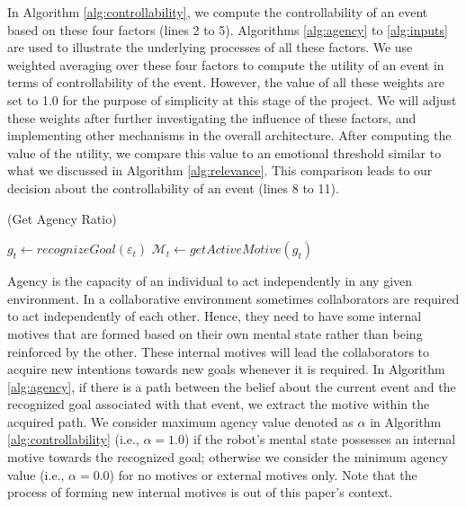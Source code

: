\documentclass{aamas2016}
\begin{document}
In Algorithm \ref{alg:controllability}, we compute the controllability of an
event based on these four factors (lines 2 to 5). Algorithms \ref{alg:agency} to
\ref{alg:inputs} are used to illustrate the underlying processes of all these
factors. We use weighted averaging over these four factors to compute the
utility of an event in terms of controllability of the event. However, the
value of all these weights are set to 1.0 for the purpose of simplicity at
this stage of the project. We will adjust these weights after further
investigating the influence of these factors, and implementing other mechanisms
in the overall architecture. After computing the value of the utility, we
compare this value to an emotional threshold similar to what we discussed in
Algorithm \ref{alg:relevance}. This comparison leads to our decision about the
controllability of an event (lines 8 to 11).

\renewcommand\thealgorithm{4\alph{algorithm}}
\setcounter{algorithm}{0}

\begin{algorithm}
	\caption{(Get Agency Ratio)}
	\label{alg:agency}
	\begin{algorithmic}[1]
			\Statex
			\State $\mathit{g}_{t} \gets \textit{recognizeGoal}{(\varepsilon_t)}$
			\Statex
			\State $\mathcal{M}_{t} \gets \textit{getActiveMotive}{(\mathit{g}_{t})}$
			\Statex
				 \State {}
				\Else
					\State {}
				\EndIf
			\Else
				\State {}
			\EndIf
		\EndFunction 
	\end{algorithmic}
\end{algorithm}

Agency is the capacity of an individual to act independently in any given
environment. In a collaborative environment sometimes collaborators are required
to act independently of each other. Hence, they need to have some internal motives
that are formed based on their own mental state rather than being reinforced by
the other. These internal motives will lead the collaborators to acquire new
intentions towards new goals whenever it is required. In Algorithm
\ref{alg:agency}, if there is a path between the belief about the current event
and the recognized goal associated with that event, we extract the motive within
the acquired path. We consider maximum agency value denoted as $\alpha$ in
Algorithm \ref{alg:controllability} (i.e., $\alpha=1.0$) if the robot's mental
state possesses an internal motive towards the recognized goal; otherwise we
consider the minimum agency value (i.e., $\alpha=0.0$) for no motives or
external motives only. Note that the process of forming new internal motives is
out of this paper's context.
\end{document}
